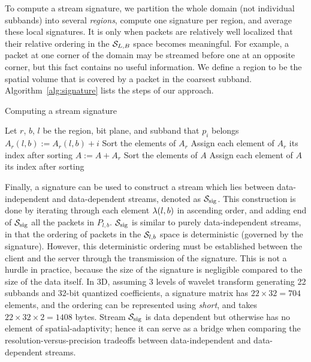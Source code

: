 To compute a stream signature, we partition the whole domain (not individual subbands) into several
\emph{regions}, compute one signature per region, and average these local signatures. It is only
when packets are relatively well localized that their relative ordering in the $\strm_{L,B}$ space
becomes meaningful. For example, a packet at one corner of the domain may be streamed before one at
an opposite corner, but this fact contains no useful information. We define a region to be the
spatial volume that is covered by a packet in the coarsest subband. Algorithm~\ref{alg:signature}
lists the steps of our approach.

\begin{algorithm}[h]
  \caption{Computing a stream signature}
  \begin{algorithmic}[1]
			\State Let $r$, $b$, $l$ be the region, bit plane, and subband that $p_i$ belongs
			\State $A_r(l,b) := A_r(l,b)+i$
		\EndFor
			\State Sort the elements of $A_r$
			\State Assign each element of $A_r$ its index after sorting
			\State $A := A+A_r$
		\EndFor
		\State Sort the elements of $A$
		\State Assign each element of $A$ its index after sorting
	\end{algorithmic}
	\label{alg:signature}
\end{algorithm}

Finally, a signature can be used to construct a stream which lies between data-independent and data-dependent streams, denoted as
$\ssig$. This construction is done by iterating through each element $\sgn(l,b)$ in ascending order,
and adding end of $\ssig$ all the packets in $P_{l,b}$. $\ssig$ is similar to purely
data-independent streams, in that the ordering of packets in the $\strm_{l,b}$ space is
deterministic (governed by the signature). However, this deterministic ordering must be established
between the client and the server through the transmission of the signature. This is not a hurdle in
practice, because the size of the signature is negligible compared to the size of the data itself.
In 3D, assuming 3 levels of wavelet transform generating 22 subbands  and 32-bit quantized coefficients, a signature matrix has
$22 \times 32 = 704$ elements, and
the ordering can be represented using \emph{short}, and takes $22\times 32\times 2 = 1408$ bytes.
Stream $\ssig$ is data dependent but otherwise has no element of
spatial-adaptivity; hence it can serve as a bridge when comparing the resolution-versus-precision
tradeoffs between data-independent and data-dependent streams.

